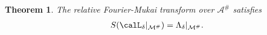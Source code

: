\documentclass[12pt]{article}
\numberwithin{equation}{section}
\newtheorem{theorem}{Theorem}
\theoremstyle{remark}
\newtheorem{remark}[theorem]{Remark}
\theoremstyle{definition}
\numberwithin{theorem}{section}
\def\beq{\begin{eqnarray}}
\def\eeq{\end{eqnarray}}
\def\bE{{\mathbb{E}}}
\def\M{{\mathcal{M}}}
\def\calA{{\mathcal{A}}}
\def\calO{{\mathcal O}}
\def\d{{{\delta}}}
\renewcommand{\1}{\mathbbm{1}}
\begin{document}
\begin{theorem} \label{fouriermukai}   The relative Fourier-Mukai transform over 
	$\calA^\#$  satisfies 
	\beq \label{mirrorl} S(\calL_{\d}|_{\M^\#})=\Lambda_{\d}|_{\M^\#}.\eeq
\end{theorem}

\end{document}
